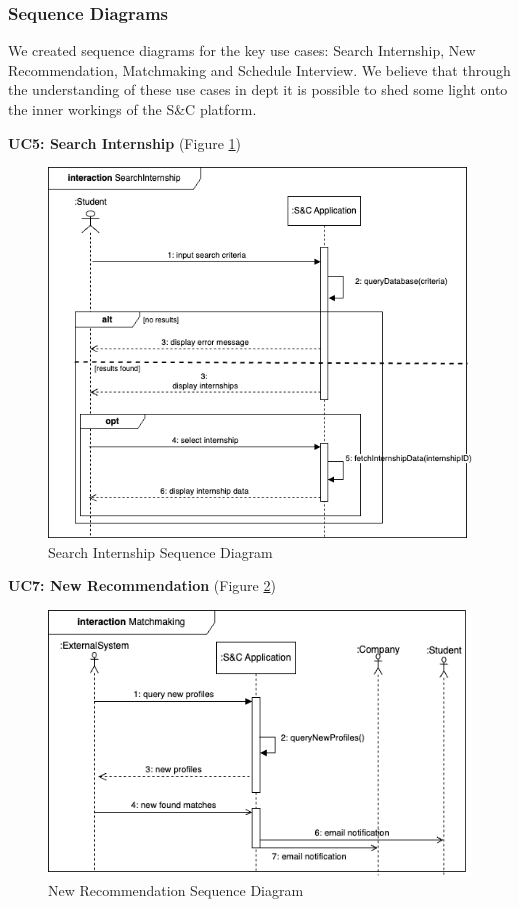 \clearpage
\subsubsection{Sequence Diagrams}
We created sequence diagrams for the key use cases: Search Internship, New Recommendation, Matchmaking and Schedule Interview. We believe that through the understanding of these use cases in dept it is possible to shed some light onto the inner workings of the S\&C platform.

\textbf{UC5: Search Internship} (Figure \ref{fig:search_sequence})
\begin{figure}[H]
\centering
\includegraphics[width=\textwidth]{Images/searchInternship-sequence.png}
\caption{\label{fig:search_sequence} Search Internship Sequence Diagram}
\end{figure}

\textbf{UC7: New Recommendation} (Figure \ref{fig:matchmaking})
\begin{figure}[H]
\centering
\includegraphics[width=\textwidth]{Images/matchmaking-sequence.png}
\caption{\label{fig:matchmaking} New Recommendation Sequence Diagram}
\end{figure}



